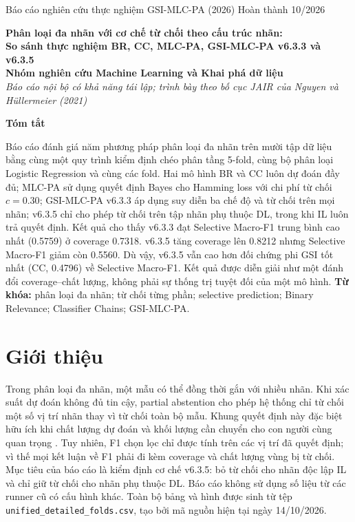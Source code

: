 \documentclass[11pt,a4paper,twoside]{article}
\begin{document}
\thispagestyle{empty}
\noindent\small Báo cáo nghiên cứu thực nghiệm GSI-MLC-PA (2026) \hfill Hoàn thành 10/2026
\vspace{2.5em}
\begin{center}
{\LARGE\bfseries Phân loại đa nhãn với cơ chế từ chối theo cấu trúc nhãn:\\[0.25em] So sánh thực nghiệm BR, CC, MLC-PA, GSI-MLC-PA v6.3.3 và v6.3.5}\\[1.5em]
{\large\bfseries Nhóm nghiên cứu Machine Learning và Khai phá dữ liệu}\\[0.3em]
{\itshape Báo cáo nội bộ có khả năng tái lập; trình bày theo bố cục JAIR của Nguyen và Hüllermeier (2021)}\\
\end{center}
\vspace{1.2em}
\begin{center}\bfseries Tóm tắt\end{center}
Báo cáo đánh giá năm phương pháp phân loại đa nhãn trên mười tập dữ liệu bằng cùng một quy trình kiểm định chéo phân tầng 5-fold, cùng bộ phân loại Logistic Regression và cùng các fold. Hai mô hình BR và CC luôn dự đoán đầy đủ; MLC-PA sử dụng quyết định Bayes cho Hamming loss với chi phí từ chối $c=0.30$; GSI-MLC-PA v6.3.3 áp dụng suy diễn ba chế độ và từ chối trên mọi nhãn; v6.3.5 chỉ cho phép từ chối trên tập nhãn phụ thuộc DL, trong khi IL luôn trả quyết định. Kết quả cho thấy v6.3.3 đạt Selective Macro-F1 trung bình cao nhất (0.5759) ở coverage 0.7318. v6.3.5 tăng coverage lên 0.8212 nhưng Selective Macro-F1 giảm còn 0.5560. Dù vậy, v6.3.5 vẫn cao hơn đối chứng phi GSI tốt nhất (CC, 0.4796) về Selective Macro-F1. Kết quả được diễn giải như một đánh đổi coverage--chất lượng, không phải sự thống trị tuyệt đối của một mô hình.
\vspace{0.5em}
\noindent\textbf{Từ khóa:} phân loại đa nhãn; từ chối từng phần; selective prediction; Binary Relevance; Classifier Chains; GSI-MLC-PA.
\section{Giới thiệu}
Trong phân loại đa nhãn, một mẫu có thể đồng thời gắn với nhiều nhãn. Khi xác suất dự đoán không đủ tin cậy, partial abstention cho phép hệ thống chỉ từ chối một số vị trí nhãn thay vì từ chối toàn bộ mẫu. Khung quyết định này đặc biệt hữu ích khi chất lượng dự đoán và khối lượng cần chuyển cho con người cùng quan trọng \cite{nguyen2021,chow1970}. Tuy nhiên, F1 chọn lọc chỉ được tính trên các vị trí đã quyết định; vì thế mọi kết luận về F1 phải đi kèm coverage và chất lượng vùng bị từ chối.
Mục tiêu của báo cáo là kiểm định cơ chế v6.3.5: bỏ từ chối cho nhãn độc lập IL và chỉ giữ từ chối cho nhãn phụ thuộc DL. Báo cáo không sử dụng số liệu từ các runner cũ có cấu hình khác. Toàn bộ bảng và hình được sinh từ tệp \texttt{unified\_detailed\_folds.csv}, tạo bởi mã nguồn hiện tại ngày 14/10/2026.
\end{document}
